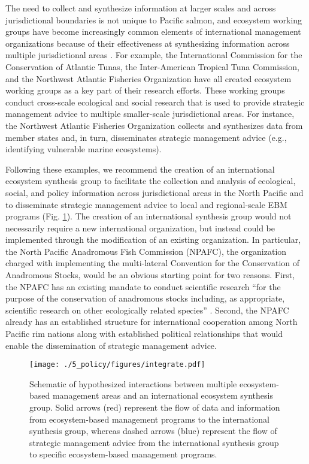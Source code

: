 The need to collect and synthesize information at larger scales and across
jurisdictional boundaries is not unique to Pacific salmon, and ecosystem working
groups have become increasingly common elements of international management
organizations because of their effectiveness at synthesizing information across
multiple jurisdictional areas \citep{Engler2015, Lascelles2014}. For example,
the International Commission for the Conservation of Atlantic Tunas, the
Inter-American Tropical Tuna Commission, and the Northwest Atlantic Fisheries
Organization have all created ecosystem working groups as a key part of their
research efforts. These working groups conduct cross-scale ecological and social
research that is used to provide strategic management advice to multiple
smaller-scale jurisdictional areas. For instance, the Northwest Atlantic
Fisheries Organization collects and synthesizes data from member states and, in
turn, disseminates strategic management advice (e.g., identifying vulnerable
marine ecosystems).

Following these examples, we recommend the creation of an international
ecosystem synthesis group to facilitate the collection and analysis of
ecological, social, and policy information across jurisdictional areas in the
North Pacific and to disseminate strategic management advice to local and
regional-scale EBM programs (Fig. \ref{fig:ebm:4}). The creation of an
international synthesis group would not necessarily require a new international
organization, but instead could be implemented through the modification of an
existing organization. In particular, the North Pacific Anadromous Fish
Commission (NPAFC), the organization charged with implementing the multi-lateral
Convention for the Conservation of Anadromous Stocks, would be an obvious
starting point for two reasons. First, the NPAFC has an existing mandate to
conduct scientific research ``for the purpose of the conservation of anadromous
stocks including, as appropriate, scientific research on other ecologically
related species'' \citep{CCAS1992}. Second, the NPAFC already has an established
structure for international cooperation among North Pacific rim nations along
with established political relationships that would enable the dissemination of
strategic management advice.

\begin{figure}[htbp]
  \centering \texttt{[image: ./5\_policy/figures/integrate.pdf]}
  \caption[Schematic of hypothesized interactions between multiple
           ecosystem-based management areas and an international ecosystem
           synthesis group.]{Schematic of hypothesized interactions between
           multiple ecosystem-based management areas and an international
           ecosystem synthesis group. Solid arrows (red) represent the flow of
           data and information from ecosystem-based management programs to the
           international synthesis group, whereas dashed arrows (blue) represent
           the flow of strategic management advice from the international
           synthesis group to specific ecosystem-based management programs.}
  \label{fig:ebm:4}
\end{figure}

